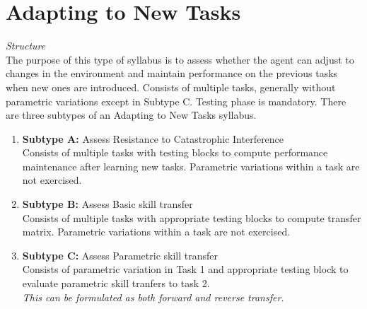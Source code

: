 \section{Adapting to New Tasks}
\textit{Structure}\\[0.1in]

The purpose of this type of syllabus is to assess whether the agent can adjust to changes in the environment and maintain performance on the previous tasks when new ones are introduced. Consists of multiple tasks, generally without parametric variations except in Subtype C. Testing phase is mandatory. There are three subtypes of an Adapting to New Tasks syllabus.

\begin{enumerate}
    \item \textbf{Subtype A:} Assess Resistance to Catastrophic Interference\\
        Consists of multiple tasks with testing blocks to compute performance maintenance after learning new tasks. Parametric variations within a task are not exercised.\\
                    
    \item \textbf{Subtype B:} Assess Basic skill transfer\\
        Consists of multiple tasks with appropriate testing blocks to compute transfer matrix. Parametric variations within a task are not exercised.\\
            
    \item \textbf{Subtype C:} Assess Parametric skill transfer\\
        Consists of parametric variation in Task 1 and appropriate testing block to evaluate parametric skill tranfers to task 2.\\
        \textit{This can be formulated as both forward and reverse transfer.}\\
\end{enumerate}

\iffalse

